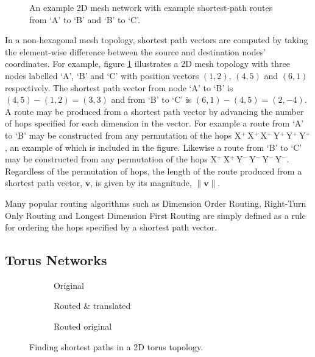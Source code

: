 		\begin{figure}
			\center
			\caption{An example 2D mesh network with example shortest-path routes
			from `A' to `B' and `B' to `C'.}
			\label{fig:mesh-topology-coordinates}
		\end{figure}
		
		In a non-hexagonal mesh topology, shortest path vectors are computed by
		taking the element-wise difference between the source and destination
		nodes' coordinates. For example, figure \ref{fig:mesh-topology-coordinates}
		illustrates a 2D mesh topology with three nodes labelled `A', `B' and `C'
		with position vectors $(1, 2)$, $(4, 5)$ and $(6, 1)$ respectively. The
		shortest path vector from node `A' to `B' is $(4, 5) - (1, 2) = (3, 3)$ and
		from `B' to `C' is $(6, 1) - (4, 5) = (2, -4)$. A route may be produced
		from a shortest path vector by advancing the number of hops specified for
		each dimension in the vector.  For example a route from `A' to `B' may be
		constructed from any permutation of the hops
		X$^+\,$X$^+\,$X$^+\,$Y$^+\,$Y$^+\,$Y$^+$, an example of which is included
		in the figure. Likewise a route from `B' to `C' may be constructed from any
		permutation of the hops X$^+\,$X$^+\,$Y$^-\,$Y$^-\,$Y$^-\,$Y$^-$.
		Regardless of the permutation of hops, the length of the route produced
		from a shortest path vector, $\mathbf{v}$, is given by its magnitude,
		$\|\mathbf{v}\|$.
		
		Many popular routing algorithms such as Dimension Order Routing, Right-Turn
		Only Routing and Longest Dimension First Routing \cite{dally04,davies12}
		are simply defined as a rule for ordering the hops specified by a shortest
		path vector.
		
		\subsection{Torus Networks}
			
			\begin{figure}
				\center
				\begin{subfigure}{0.3\linewidth}
					\center
					\caption{Original}
					\label{fig:torus-shortest-path-example}
				\end{subfigure}
				\begin{subfigure}{0.3\linewidth}
					\center
					\caption{Routed \& translated}
					\label{fig:torus-shortest-path-translate}
				\end{subfigure}
				\begin{subfigure}{0.3\linewidth}
					\center
					\caption{Routed original}
					\label{fig:torus-shortest-path-routed}
				\end{subfigure}
				
				\caption{Finding shortest paths in a 2D torus topology.}
				\label{fig:torus-shortest-path}
			\end{figure}
			
